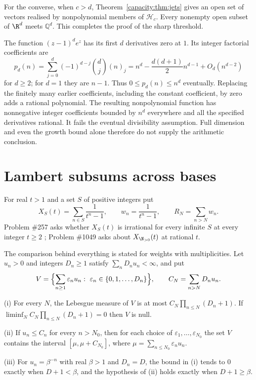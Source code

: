 \documentclass[11pt]{article}
\begin{document}
For the converse, when $c>d$, Theorem~\ref{capacity:thm:jets} gives an open
set of vectors realised by nonpolynomial members of $\mathcal H_c$.
Every nonempty open subset of $\R^d$ meets $\mathbb Q^d$. This completes
the proof of the sharp threshold.

\begin{remark}
The function $(z-1)^de^z$ has its first $d$ derivatives zero at $1$.
Its integer factorial coefficients are
\[
 p_d(n)=\sum_{j=0}^d(-1)^{d-j}\binom dj(n)_j
       =n^d-\frac{d(d+1)}2n^{d-1}+O_d(n^{d-2})
\]
for $d\ge2$; for $d=1$ they are $n-1$.
Thus $0\le p_d(n)\le n^d$ eventually. Replacing the finitely many earlier
coefficients, including the constant coefficient, by zero adds a rational
polynomial. The resulting nonpolynomial function has nonnegative integer
coefficients bounded by $n^d$ everywhere and all the specified derivatives
rational. It fails the eventual divisibility assumption. Full dimension
and even the growth bound alone therefore do not supply the arithmetic
conclusion.
\end{remark}


\section{Lambert subsums across bases}\label{sec:results}

For real $t>1$ and a set $S$ of
positive integers put
\[
 X_S(t)=\sum_{n\in S}\frac{1}{t^n-1},\qquad
 w_n=\frac{1}{t^n-1},\qquad R_N=\sum_{n>N}w_n .
\]
Problem \#257 asks whether $X_S(t)$ is irrational for every infinite $S$ at
every integer $t\ge2$ \cite[p.~62]{erdosgraham1980}; Problem \#1049 asks about
$X_{\N_{>0}}(t)$ at rational $t$.

The comparison behind everything is stated for weights with multiplicities.
Let $u_n>0$ and integers $D_n\ge1$ satisfy $\sum_nD_nu_n<\infty$, and put
\[
 V=\Bigl\{\sum_{n\ge1}\varepsilon_nu_n:\ \varepsilon_n\in\{0,1,\dots,D_n\}\Bigr\},
 \qquad C_N=\sum_{n>N}D_nu_n .
\]

\begin{theorem}\label{thm:dichotomy}
\textup{(i)} For every $N$, the Lebesgue measure of $V$ is at most
$C_N\prod_{n\le N}(D_n+1)$.  If $\liminf_NC_N\prod_{n\le N}(D_n+1)=0$ then $V$
is null.

\textup{(ii)} If $u_n\le C_n$ for every $n>N_0$, then for each choice of
$\varepsilon_1,\dots,\varepsilon_{N_0}$ the set $V$ contains the interval
$[\mu,\mu+C_{N_0}]$, where $\mu=\sum_{n\le N_0}\varepsilon_nu_n$.

\textup{(iii)} For $u_n=\beta^{-n}$ with real $\beta>1$ and $D_n=D$, the bound in
\textup{(i)} tends to $0$ exactly when $D+1<\beta$, and the hypothesis of
\textup{(ii)} holds exactly when $D+1\ge\beta$.
\end{theorem}
\end{document}

